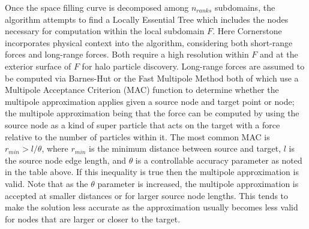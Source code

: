 Once the space filling curve is decomposed among $n_{ranks}$ subdomains, the algorithm attempts to find a Locally Essential Tree which includes the nodes necessary for computation within the local subdomain $F$. Here Cornerstone ~\cite{cornerstone} incorporates physical context into the algorithm, considering both short-range forces and long-range forces. Both require a high resolution within $F$ and at the exterior surface of $F$ for halo particle discovery. Long-range forces are assumed to be computed via Barnes-Hut or the Fast Multipole Method both of which use a Multipole Acceptance Criterion (MAC) function to determine whether the multipole approximation applies given a source node and target point or node; the multipole approximation being that the force can be computed by using the source node as a kind of super particle that acts on the target with a force relative to the number of particles within it. The most common MAC is $r_{min} > l/\theta$, where $r_{min}$ is the minimum distance between source and target, $l$ is the source node edge length, and $\theta$ is a controllable accuracy parameter as noted in the table above. If this inequality is true then the multipole approximation is valid. Note that as the $\theta$ parameter is increased, the multipole approximation is accepted at smaller distances or for larger source node lengths. This tends to make the solution less accurate as the approximation usually becomes less valid for nodes that are larger or closer to the target. 

